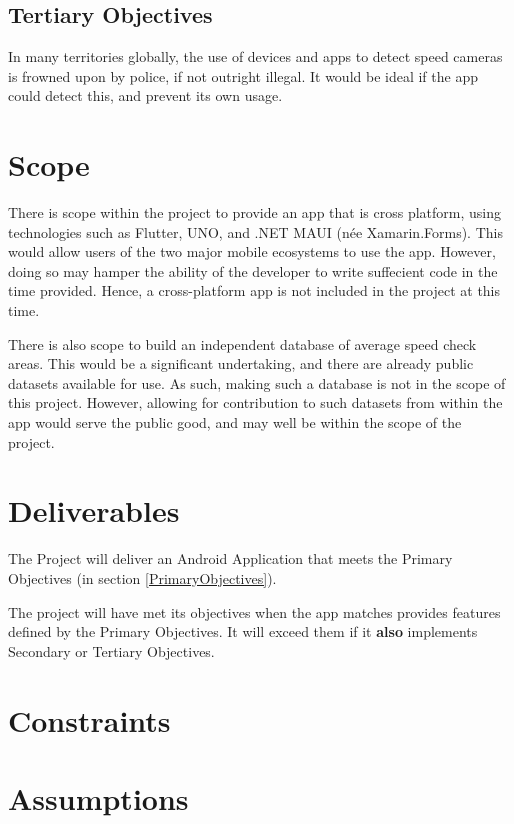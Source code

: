 \documentclass[11pt, a4paper, notitlepage]{report}
\begin{document}
\subsection{Tertiary Objectives}
In many territories globally, the use of devices and apps to detect speed 
cameras is frowned upon by police, if not outright illegal. It would be ideal 
if the app could detect this, and prevent its own usage.

\section{Scope}
There is scope within the project to provide an app that is cross 
platform, using technologies such as Flutter, UNO, and .NET MAUI (née 
Xamarin.Forms). 
This would allow users of the two major mobile ecosystems to use the app. 
However, doing so may hamper the ability of the developer to write suffecient 
code in the time provided.
Hence, a cross-platform app is not included in the project at this time.

There is also scope to build an independent database of average speed check 
areas. 
This would be a significant undertaking, and there are already public datasets 
available for use. As such, making such a database is not 
in the scope of this project.
However, allowing for contribution to such datasets from within the app would 
serve the public good, and may well be within the scope of the project.

\section{Deliverables}
The Project will deliver an Android Application that meets the Primary 
Objectives (in section \ref{PrimaryObjectives}).

The project will have met its objectives when the app matches provides 
features defined by the Primary Objectives. It will exceed them if it 
\textbf{also} implements Secondary or Tertiary Objectives.

\section{Constraints}

\section{Assumptions}
\end{document}
